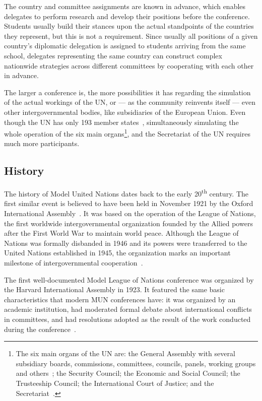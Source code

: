 The country and committee assignments are known in advance, which enables delegates to perform research and develop their positions before the conference. Students usually build their stances upon the actual standpoints of the countries they represent, but this is not a requirement. Since usually all positions of a given country's diplomatic delegation is assigned to students arriving from the same school, delegates representing the same country can construct complex nationwide strategies across different committees by cooperating with each other in advance.

The larger a conference is, the more possibilities it has regarding the simulation of the actual workings of the UN, or — as the community reinvents itself — even other intergovernmental bodies, like subsidiaries of the European Union. Even though the UN has only 193 member states~\cite{unmembers}, simultaneously simulating the whole operation of the six main organs\footnote{The six main organs of the UN are: the General Assembly with several subsidiary boards, commissions, committees, councils, panels, working groups and others~\cite{gasubsidiaries}; the Security Council; the Economic and Social Council; the Trusteeship Council; the International Court of Justice; and the Secretariat~\cite{unmainorgans}.}, and the Secretariat of the UN requires much more participants.

\subsection{History}

The history of Model United Nations dates back to the early 20\textsuperscript{th} century. The first similar event is believed to have been held in November 1921 by the Oxford International Assembly~\cite{historyofthefirstmun}. It was based on the operation of the League of Nations, the first worldwide intergovernmental organization founded by the Allied powers after the First World War to maintain world peace. Although the League of Nations was formally disbanded in 1946 and its powers were transferred to the United Nations established in 1945, the organization marks an important milestone of intergovernmental cooperation~\cite{leagueofnationsbritannica}.

The first well-documented Model League of Nations conference was organized by the Harvard International Assembly in 1923. It featured the same basic characteristics that modern MUN conferences have: it was organized by an academic institution, had moderated formal debate about international conflicts in committees, and had resolutions adopted as the result of the work conducted during the conference~\cite{historyofthefirstmun}.


